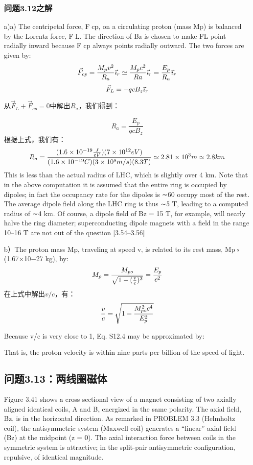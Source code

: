\subsubsection{问题3.12之解}
a)a) The centripetal force, Fcp, on a circulating proton (mass Mp) is balanced by
the Lorentz force, FL. The direction of Bz is chosen to make FL point radially
inward because F
cp always points radially outward. The two forces are given by:
$$
\vec{F}_{cp}=\frac{M_{p}v^{2}}{R_{a}}\vec{\imath}_{r}\simeq\frac{M_{p}c^{2}}{Ra}\vec{\imath}_{r}=\frac{E_{p}}{R_{a}}\vec{\imath}_{r}\\%
$$
$$
\vec{F}_{L}=-qcB_{z}\vec{\imath}_{r}\\%
$$

从$\vec{F}_{L}+\vec{F}_{cp}=0$中解出$R_a$，我们得到：

$$
R_a=\frac{E_p}{q c B_z} %
$$
根据上式，我们有：
$$
R_{a}=\frac{(1.6\times10^{-19}\frac{J}{eV})(7\times10^{12}eV)}{(1.6\times10^{-19}C)(3\times10^{8}m/s)(8.3T)}\\
\simeq2.81\times10^{3}m\simeq2.8km\\
$$
This is less than the actual radius of LHC, which is slightly over 4 km. Note that in
the above computation it is assumed that the entire ring is occupied by dipoles; in
fact the occupancy rate for the dipoles is ∼60%
occupy most of the rest. The average dipole field along the LHC ring is thus ∼5 T,
leading to a computed radius of ∼4 km. Of course, a dipole field of Bz = 15 T,
for example, will nearly halve the ring diameter; superconducting dipole magnets
with a field in the range 10–16 T are not out of the question [3.54–3.56]

b）The proton mass Mp, traveling at speed v, is related to its rest mass, Mp◦
(1.67×10−27 kg), by:
$$
M_{p}=\frac{M_{po}}{\sqrt{1-(\frac{v}{c})^{2}}}=\frac{E_{p}}{c^{2}}\\%
$$
在上式中解出$v/c$，有：
$$
\frac{v}{c}=\sqrt{1-\frac{M_{po}^{2}c^{4}}{E_{p}^{2}}}\\%
$$

Because v/c is very close to 1, Eq. S12.4 may be approximated by:

That is, the proton velocity is within nine parts per billion of the speed of light.
\newpage



\subsection{问题3.13：两线圈磁体}
Figure 3.41 shows a cross sectional view of a magnet consisting of two axially
aligned identical coils, A and B, energized in the same polarity. The axial field,
Bz, is in the horizontal direction. As remarked in PROBLEM 3.3 (Helmholtz coil),
the antisymmetric system (Maxwell coil) generates a “linear” axial field (Bz) at
the midpoint (z = 0). The axial interaction force between coils in the symmetric
system is attractive; in the split-pair antisymmetric configuration, repulsive, of
identical magnitude.

